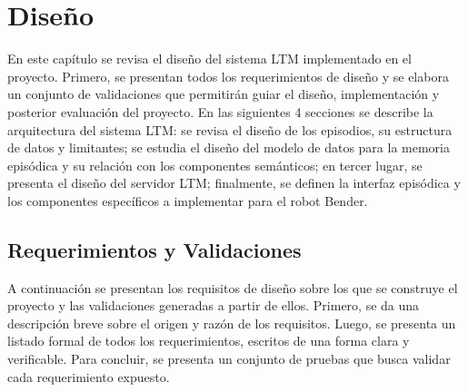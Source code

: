 \chapter{Diseño}\label{chapter:diseno}

En este capítulo se revisa el diseño del sistema LTM implementado en el proyecto. Primero, se presentan todos los requerimientos de diseño y se elabora un conjunto de validaciones que permitirán guiar el diseño, implementación y posterior evaluación del proyecto. En las siguientes 4 secciones se describe la arquitectura del sistema LTM: se revisa el diseño de los episodios, su estructura de datos y limitantes; se estudia el diseño del modelo de datos para la memoria episódica y su relación con los componentes semánticos; en tercer lugar, se presenta el diseño del servidor LTM; finalmente, se definen la interfaz episódica y los componentes específicos a implementar para el robot Bender.




\section{Requerimientos y Validaciones}

A continuación se presentan los requisitos de diseño sobre los que se construye el proyecto y las validaciones generadas a partir de ellos. Primero, se da una descripción breve sobre el origen y razón de los requisitos. Luego, se presenta un listado formal de todos los requerimientos, escritos de una forma clara y verificable. Para concluir, se presenta un conjunto de pruebas que busca validar cada requerimiento expuesto.

